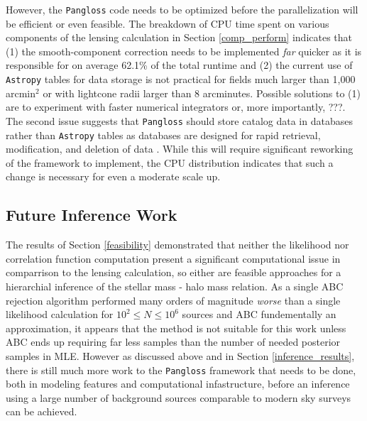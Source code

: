 \documentclass[%
 reprint,
 amsmath,amssymb,
 aps,nofootinbib
]{revtex4-1}
\begin{document}
However, the \texttt{Pangloss} code needs to be optimized before the parallelization will be efficient or even feasible. The breakdown of CPU time spent on various components of the lensing calculation in Section \ref{comp_perform} indicates that (1) the smooth-component correction needs to be implemented \textit{far} quicker as it is responsible for on average 62.1\% of the total runtime and (2) the current use of \texttt{Astropy} tables for data storage is not practical for fields much larger than 1,000 arcmin$^2$ or with lightcone radii larger than 8 arcminutes. Possible solutions to (1) are to experiment with faster numerical integrators or, more importantly, ???. The second issue suggests that \texttt{Pangloss} should store catalog data in databases rather than \texttt{Astropy} tables as databases are designed for rapid retrieval, modification, and deletion of data \cite{??}. While this will require significant reworking of the framework to implement, the CPU distribution indicates that such a change is necessary for even a moderate scale up.

\subsection{Future Inference Work}

The results of Section \ref{feasibility} demonstrated that neither the likelihood nor correlation function computation present a significant computational issue in comparrison to the lensing calculation, so either are feasible approaches for a hierarchial inference of the stellar mass - halo mass relation. As a single ABC rejection algorithm performed many orders of magnitude \textit{worse} than a single likelihood calculation for ${10^2\leq N\leq10^6}$ sources and ABC fundementally an approximation, it appears that the method is not suitable for this work unless ABC ends up requiring far less samples than the number of needed posterior samples in MLE. However as discussed above and in Section \ref{inference_results}, there is still much more work to the \texttt{Pangloss} framework that needs to be done, both in modeling features and computational infastructure, before an inference using a large number of background sources comparable to modern sky surveys can be achieved.


\end{document}
